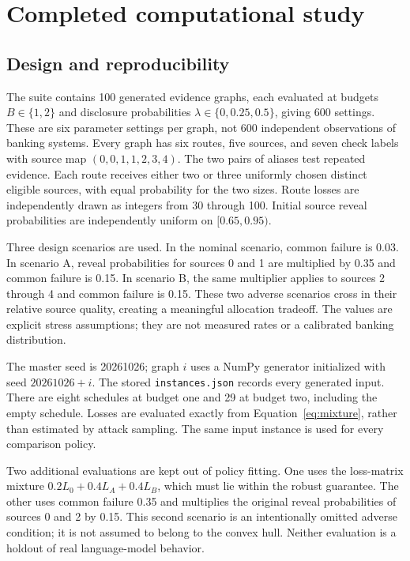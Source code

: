 \documentclass[11pt,letterpaper]{article}
\begin{document}
\section{Completed computational study}

\subsection{Design and reproducibility}

The suite contains 100 generated evidence graphs, each evaluated at budgets $B\in\{1,2\}$ and disclosure probabilities $\lambda\in\{0,0.25,0.5\}$, giving 600 settings. These are six parameter settings per graph, not 600 independent observations of banking systems. Every graph has six routes, five sources, and seven check labels with source map $(0,0,1,1,2,3,4)$. The two pairs of aliases test repeated evidence. Each route receives either two or three uniformly chosen distinct eligible sources, with equal probability for the two sizes. Route losses are independently drawn as integers from 30 through 100. Initial source reveal probabilities are independently uniform on $[0.65,0.95)$.

Three design scenarios are used. In the nominal scenario, common failure is 0.03. In scenario A, reveal probabilities for sources 0 and 1 are multiplied by 0.35 and common failure is 0.15. In scenario B, the same multiplier applies to sources 2 through 4 and common failure is 0.15. These two adverse scenarios cross in their relative source quality, creating a meaningful allocation tradeoff. The values are explicit stress assumptions; they are not measured rates or a calibrated banking distribution.

The master seed is 20261026; graph $i$ uses a NumPy generator initialized with seed $20261026+i$. The stored \texttt{instances.json} records every generated input. There are eight schedules at budget one and 29 at budget two, including the empty schedule. Losses are evaluated exactly from Equation~\ref{eq:mixture}, rather than estimated by attack sampling. The same input instance is used for every comparison policy.

Two additional evaluations are kept out of policy fitting. One uses the loss-matrix mixture $0.2L_0+0.4L_A+0.4L_B$, which must lie within the robust guarantee. The other uses common failure 0.35 and multiplies the original reveal probabilities of sources 0 and 2 by 0.15. This second scenario is an intentionally omitted adverse condition; it is not assumed to belong to the convex hull. Neither evaluation is a holdout of real language-model behavior.
\end{document}
